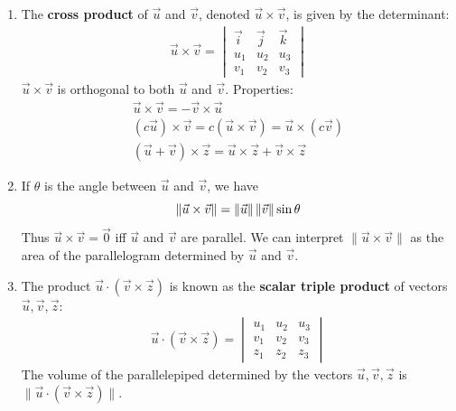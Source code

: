 \documentclass[10pt]{article}
\begin{document}
\begin{multicols*}{2}
\begin{enumerate}
\begin{enumerate}
    \item The \textbf{cross product} of $\vec{u}$ and $\vec{v}$, denoted $\vec{u} \times \vec{v}$, is given by the determinant:
    \begin{align*}
        \vec{u} \times \vec{v} = 
        \begin{vmatrix}
        \vec{i} & \vec{j} & \vec{k} \\
        u_1 & u_2 & u_3 \\
        v_1 & v_2 & v_3 
        \end{vmatrix}
    \end{align*}
    $\vec{u} \times \vec{v}$ is orthogonal to both $\vec{u}$ and $\vec{v}$. Properties:
    \begin{align*}
        \vec{u} \times \vec{v} = -\vec{v} \times \vec{u} \\
        (c\vec{u}) \times \vec{v} = c(\vec{u} \times \vec{v}) = \vec{u} \times (c\vec{v}) \\
        (\vec{u} + \vec{v}) \times \vec{z} = \vec{u} \times \vec{z} + \vec{v} \times \vec{z}
    \end{align*}
    \item If $\theta$ is the angle between $\vec{u}$ and $\vec{v}$, we have
    \begin{equation*}
        \| \vec{u} \times \vec{v} \| = \| \vec{u} \| \hspace{.5mm} \| \vec{v} \| \sin{\theta}
    \end{equation*}
    Thus $\vec{u} \times \vec{v} = \vec{0}$ iff $\vec{u}$ and $\vec{v}$ are parallel. We can interpret $\| \vec{u} \times \vec{v} \|$ as the area of the parallelogram determined by $\vec{u}$ and $\vec{v}$.
    \item The product $\vec{u} \cdot (\vec{v} \times \vec{z})$ is known as the \textbf{scalar triple product} of vectors $\vec{u}, \vec{v}, \vec{z}$:
    \begin{align*}
        \vec{u} \cdot (\vec{v} \times \vec{z}) = 
        \begin{vmatrix}
        u_1 & u_2 & u_3 \\
        v_1 & v_2 & v_3 \\
        z_1 & z_2 & z_3
        \end{vmatrix}
    \end{align*}
    The volume of the parallelepiped determined by the vectors $\vec{u}, \vec{v}, \vec{z}$ is $\| \vec{u} \cdot (\vec{v} \times \vec{z}) \|$.
    \end{enumerate}


\end{enumerate}
\end{multicols*}
\end{document}
